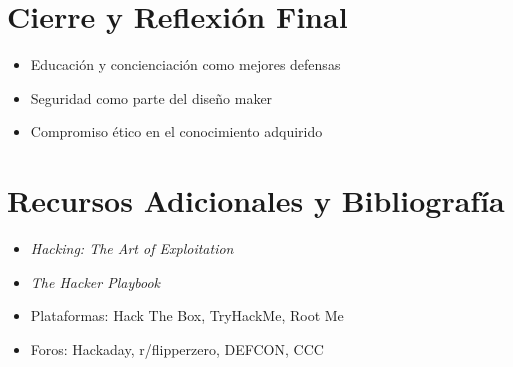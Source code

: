 \documentclass[a4paper,12pt]{article}
\begin{document}
\section{Cierre y Reflexión Final}

\begin{itemize}
    \item Educación y concienciación como mejores defensas
    \item Seguridad como parte del diseño maker
    \item Compromiso ético en el conocimiento adquirido
\end{itemize}

\section{Recursos Adicionales y Bibliografía}

\begin{itemize}
    \item \textit{Hacking: The Art of Exploitation}
    \item \textit{The Hacker Playbook}
    \item Plataformas: Hack The Box, TryHackMe, Root Me
    \item Foros: Hackaday, r/flipperzero, DEFCON, CCC
\end{itemize}
\end{document}
